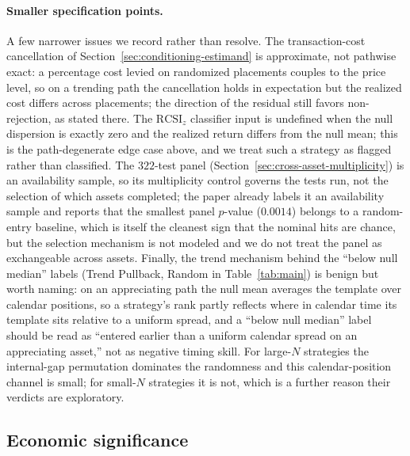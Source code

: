 \documentclass[risks,article,submit,pdftex,oneauthor]{Definitions/mdpi}
\begin{document}
\paragraph{Smaller specification points.} A few narrower issues we record rather than
resolve. The transaction-cost cancellation of Section~\ref{sec:conditioning-estimand}
is approximate, not pathwise exact: a percentage cost levied on randomized placements
couples to the price level, so on a trending path the cancellation holds in expectation
but the realized cost differs across placements; the direction of the residual still
favors non-rejection, as stated there. The $\mathrm{RCSI}_z$ classifier input is
undefined when the null dispersion is exactly zero and the realized return differs from
the null mean; this is the path-degenerate edge case above, and we treat such a
strategy as flagged rather than classified. The $322$-test panel
(Section~\ref{sec:cross-asset-multiplicity}) is an availability sample, so its multiplicity
control governs the tests run, not the selection of which assets completed; the paper
already labels it an availability sample and reports that the smallest panel $p$-value
($0.0014$) belongs to a random-entry baseline, which is itself the cleanest sign that
the nominal hits are chance, but the selection mechanism is not modeled and we do not
treat the panel as exchangeable across assets. Finally, the trend mechanism behind the
``below null median'' labels (Trend Pullback, Random in Table~\ref{tab:main}) is
benign but worth naming: on an appreciating path the null mean averages the template
over calendar positions, so a strategy's rank partly reflects where in calendar time
its template sits relative to a uniform spread, and a ``below null median'' label
should be read as ``entered earlier than a uniform calendar spread on an appreciating
asset,'' not as negative timing skill. For large-$N$ strategies the internal-gap
permutation dominates the randomness and this calendar-position channel is small; for
small-$N$ strategies it is not, which is a further reason their verdicts are
exploratory.

\subsection{Economic significance}
\label{sec:discussion-economic}
\end{document}
